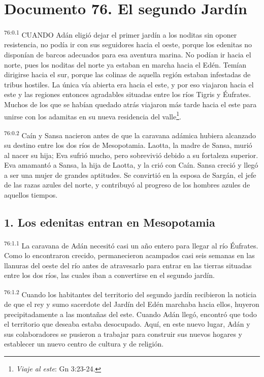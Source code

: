\chapter{Documento 76. El segundo Jardín}
\par
\textsuperscript{76:0.1} CUANDO Adán eligió dejar el primer jardín a los noditas sin oponer resistencia, no podía ir con sus seguidores hacia el oeste, porque los edenitas no disponían de barcos adecuados para esa aventura marina. No podían ir hacia el norte, pues los noditas del norte ya estaban en marcha hacia el Edén. Temían dirigirse hacia el sur, porque las colinas de aquella región estaban infestadas de tribus hostiles. La única vía abierta era hacia el este, y por eso viajaron hacia el este y las regiones entonces agradables situadas entre los ríos Tigris y Éufrates. Muchos de los que se habían quedado atrás viajaron más tarde hacia el este para unirse con los adamitas en su nueva residencia del valle\footnote{\textit{Viaje al este}: Gn 3:23-24.}.

\par
\textsuperscript{76:0.2} Caín y Sansa nacieron antes de que la caravana adámica hubiera alcanzado su destino entre los dos ríos de Mesopotamia. Laotta, la madre de Sansa, murió al nacer su hija; Eva sufrió mucho, pero sobrevivió debido a su fortaleza superior. Eva amamantó a Sansa, la hija de Laotta, y la crió con Caín. Sansa creció y llegó a ser una mujer de grandes aptitudes. Se convirtió en la esposa de Sargán, el jefe de las razas azules del norte, y contribuyó al progreso de los hombres azules de aquellos tiempos.

\section*{1. Los edenitas entran en Mesopotamia}
\par
\textsuperscript{76:1.1} La caravana de Adán necesitó casi un año entero para llegar al río Éufrates. Como lo encontraron crecido, permanecieron acampados casi seis semanas en las llanuras del oeste del río antes de atravesarlo para entrar en las tierras situadas entre los dos ríos, las cuales iban a convertirse en el segundo jardín.

\par
\textsuperscript{76:1.2} Cuando los habitantes del territorio del segundo jardín recibieron la noticia de que el rey y sumo sacerdote del Jardín del Edén marchaba hacia ellos, huyeron precipitadamente a las montañas del este. Cuando Adán llegó, encontró que todo el territorio que deseaba estaba desocupado. Aquí, en este nuevo lugar, Adán y sus colaboradores se pusieron a trabajar para construir sus nuevos hogares y establecer un nuevo centro de cultura y de religión.

